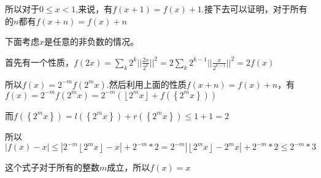 \documentclass[onecolumn]{article}
\begin{document}
所以对于$0 \leq x < 1$,来说，有$f(x+1)=f(x)+1$.接下去可以证明，对于所有的$n$都有$f(x+n)=f(x)+n$ \par
下面考虑$x$是任意的非负数的情况。 \par
首先有一个性质，$f(2x)=\sum _{k}2^{k}||\frac{2x}{2^{k}}||^{2}=2\sum _{k}2^{k-1}||\frac{x}{2^{k-1}}||^{2}=2f(x)$ \par
所以$f(x)=2^{-m}f(2^{m}x)$.然后利用上面的性质$f(x+n)=f(x)+n$，有$f(x)=2^{-m}f(2^{m}x)=2^{-m}(\left \lfloor 2^{m}x \right \rfloor+f(\left \{ 2^{m}x \right \}))$ \par
而$f(\left \{ 2^{m}x \right \})=l(\left \{ 2^{m}x \right \})+r(\left \{ 2^{m}x \right \})\leq 1+1=2$ \par
所以$|f(x)-x|\leq |2^{-m}\left \lfloor 2^{m}x \right \rfloor-x|+2^{-m}*2=2^{-m}|\left \lfloor 2^{m}x \right \rfloor-2^{m}x|+2^{-m}*2\leq 2^{-m}*3$ \par
这个式子对于所有的整数$m$成立，所以$f(x)=x$ \par
~\\
\end{document}
